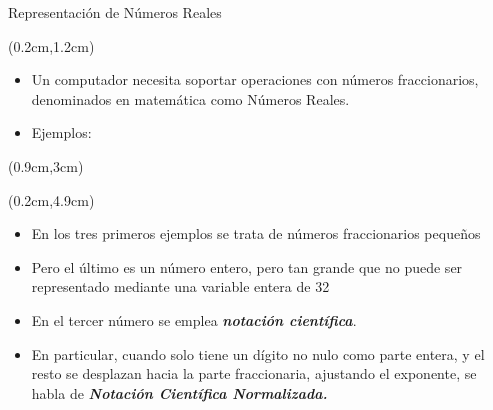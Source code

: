 \begin{frame}{Representación de Números Reales}
 \begin{textblock*}{\textwidth}(0.2cm,1.2cm)
  \begin{itemize} [<+(1)->]\justifying
   \item Un computador necesita soportar operaciones con números fraccionarios, denominados  en matemática como Números Reales.
   \item Ejemplos:
  \end{itemize}
 \end{textblock*}
 \begin{textblock*}{\textwidth}(0.9cm,3cm)
 \end{textblock*}
 \begin{textblock*}{\textwidth}(0.2cm,4.9cm)
  \begin{itemize} [<+(5)->]\justifying
   \item En los tres primeros ejemplos se trata de números fraccionarios pequeños
   \item Pero el último es un número entero, pero tan grande que no puede ser representado mediante una variable entera de \SI{32}{\bit}
   \item En el tercer número se emplea \textbf{\textit{notación científica}}.
   \item En particular, cuando solo tiene un dígito no nulo como parte entera, y el resto se desplazan hacia la parte fraccionaria, ajustando el exponente, se habla de \textbf{\textit{Notación Científica Normalizada.}}
  \end{itemize}
 \end{textblock*}
\end{frame}

